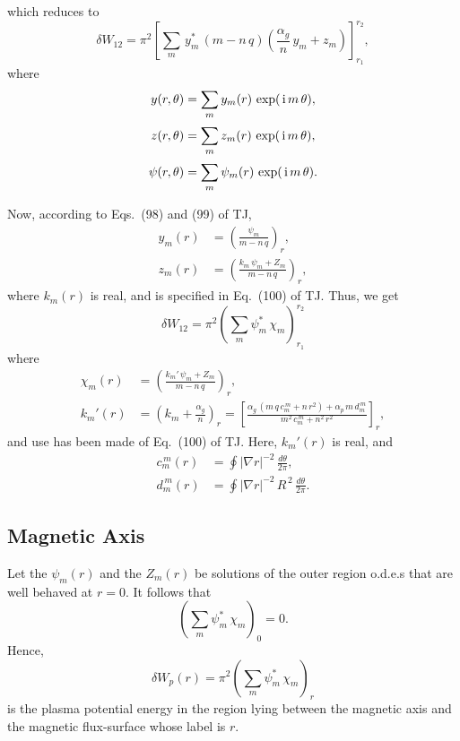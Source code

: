 \documentclass[12pt,prb,aps,notitlepage]{revtex4-1}
\begin{document}
which reduces to
\begin{equation}
\delta W_{12}= \pi^2\left[\sum_m\,y_m^\ast\,(m-n\,q)\left(\frac{\alpha_g}{n}\,y_m+z_m\right)\right]_{r_1}^{r_2},
\end{equation}
where
\begin{align}\label{e26}
y(r,\theta)&=\sum_m y_m(r)\,\exp(\,{\rm i}\,m\,\theta),\\[0.5ex]
z(r,\theta)&=\sum_m z_m(r)\,\exp(\,{\rm i}\,m\,\theta),\\[0.5ex]
\psi(r,\theta)&=\sum_m \psi_m(r)\,\exp(\,{\rm i}\,m\,\theta).\label{e28}
\end{align}

Now, according to Eqs.~(98) and (99) of TJ, 
\begin{align}\label{epsi}
y_m(r) &= \left(\frac{\psi_m}{m-n\,q}\right)_r,\\[0.5ex]
z_m(r)&= \left(\frac{k_m\,\psi_m+Z_m}{m-n\,q}\right)_r,
\end{align}
where
$k_m(r)$ is real, and is specified in Eq.~(100) of TJ. Thus, we get 
\begin{equation}
\delta W_{12}=\pi^2\left(\sum_m\psi_m^\ast\,\chi_m\right)_{r_1}^{r_2}
\end{equation}
where
\begin{align}\label{e29}
\chi_m(r)&=
 \left(\frac{k_m'\,\psi_m+Z_m}{m-n\,q}\right)_r,\\[0.5ex]
k_m'(r) &=\left( k_m + \frac{\alpha_g}{n} \right)_r= \left[\frac{\alpha_g\,(m\,q\,c_m^{\,m}+n\,r^2)+\alpha_p\,m\,d_m^{\,m}}{m^2\,c_m^{\,m}+n^2\,r^2}\right]_r,\label{e30}
\end{align}
and use has been made of Eq.~(100) of TJ. Here, $k_m'(r)$ is real, and
\begin{align}
c_m^{\,m}(r) &=\oint|\nabla r|^{-2}\,\frac{d\theta}{2\pi},\\[0.5ex]
d_m^{\,m}(r) &=\oint|\nabla r|^{-2}\,R^{\,2}\,\frac{d\theta}{2\pi}.
\end{align}

\subsection{Magnetic Axis}
Let the $\psi_m(r)$ and the $Z_m(r)$ be solutions of the outer region o.d.e.s that are well behaved at $r=0$. It follows that
\begin{equation}
\left(\sum_m\psi_m^\ast\,\chi_m\right)_{0}=0.
\end{equation}
Hence, 
\begin{equation}\label{e1}
\delta W_p(r) =\pi^2\left(\sum_m\psi_m^\ast\,\chi_m\right)_r
\end{equation}
is the plasma potential energy in the region lying between the magnetic axis and the magnetic flux-surface whose label is $r$. 
\end{document}
